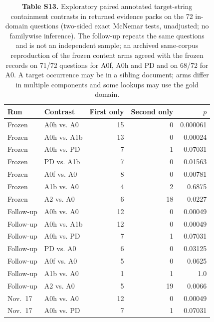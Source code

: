 \begin{table}
\centering\small
\caption{\textbf{Table S13.} Exploratory paired annotated target-string containment contrasts in
returned evidence packs on the 72 in-domain questions (two-sided exact
McNemar tests, unadjusted; no familywise inference). The follow-up repeats the
same questions and is not an independent sample; an archived same-corpus
reproduction of the frozen content arms agreed with the frozen records on
71/72 questions for A0f, A0h and PD and on 68/72 for A0. A target occurrence
may be in a sibling document; arms differ in multiple components and some
lookups may use the gold domain.}

\begin{tabular}{llrrr}
\toprule
Run & Contrast & First only & Second only & $p$ \\
\midrule
Frozen & A0h vs. A0 & 15 & 0 & 0.000061 \\
Frozen & A0h vs. A1b & 13 & 0 & 0.00024 \\
Frozen & A0h vs. PD & 7 & 1 & 0.07031 \\
Frozen & PD vs. A1b & 7 & 0 & 0.01563 \\
Frozen & A0f vs. A0 & 8 & 0 & 0.00781 \\
Frozen & A1b vs. A0 & 4 & 2 & 0.6875 \\
Frozen & A2 vs. A0 & 6 & 18 & 0.0227 \\
Follow-up & A0h vs. A0 & 12 & 0 & 0.00049 \\
Follow-up & A0h vs. A1b & 12 & 0 & 0.00049 \\
Follow-up & A0h vs. PD & 7 & 1 & 0.07031 \\
Follow-up & PD vs. A0 & 6 & 0 & 0.03125 \\
Follow-up & A0f vs. A0 & 5 & 0 & 0.0625 \\
Follow-up & A1b vs. A0 & 1 & 1 & 1.0 \\
Follow-up & A2 vs. A0 & 5 & 19 & 0.0066 \\
Nov.\ 17 & A0h vs. A0 & 12 & 0 & 0.00049 \\
Nov.\ 17 & A0h vs. PD & 7 & 1 & 0.07031 \\
\bottomrule
\end{tabular}
\end{table}

